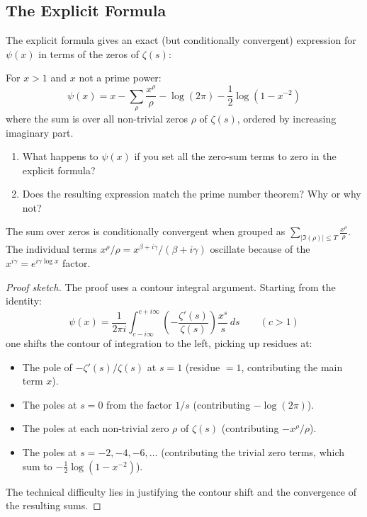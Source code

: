 \subsection{The Explicit Formula}

The explicit formula gives an exact (but conditionally convergent) expression for $\psi(x)$ in terms of the zeros of $\zeta(s)$:

\begin{theorem}
\label{thm:explicit}
For $x > 1$ and $x$ not a prime power:
\[
\psi(x) = x - \sum_{\rho} \frac{x^{\rho}}{\rho} - \log(2\pi) - \frac{1}{2} \log(1 - x^{-2})
\]
where the sum is over all non-trivial zeros $\rho$ of $\zeta(s)$, ordered by increasing imaginary part.
\end{theorem}

\begin{checkyou}
\begin{enumerate}
  \item What happens to $\psi(x)$ if you set all the zero-sum terms to zero in the explicit formula?
  \item Does the resulting expression match the prime number theorem? Why or why not?
\end{enumerate}
\end{checkyou}

\begin{remark}
The sum over zeros is conditionally convergent when grouped as $\sum_{|\Im(\rho)| \le T} \frac{x^{\rho}}{\rho}$. The individual terms $x^{\rho}/\rho = x^{\beta + i\gamma} / (\beta + i\gamma)$ oscillate because of the $x^{i\gamma} = e^{i\gamma \log x}$ factor.
\end{remark}

\begin{proof}[Proof sketch]
The proof uses a contour integral argument. Starting from the identity:
\[
\psi(x) = \frac{1}{2\pi i} \int_{c - i\infty}^{c + i\infty} \left(-\frac{\zeta'(s)}{\zeta(s)}\right) \frac{x^s}{s} \, ds \qquad (c > 1)
\]
one shifts the contour of integration to the left, picking up residues at:
\begin{itemize}
  \item The pole of $-\zeta'(s)/\zeta(s)$ at $s = 1$ (residue $= 1$, contributing the main term $x$).
  \item The poles at $s = 0$ from the factor $1/s$ (contributing $-\log(2\pi)$).
  \item The poles at each non-trivial zero $\rho$ of $\zeta(s)$ (contributing $-x^{\rho}/\rho$).
  \item The poles at $s = -2, -4, -6, \ldots$ (contributing the trivial zero terms, which sum to $-\frac{1}{2}\log(1-x^{-2})$).
\end{itemize}
The technical difficulty lies in justifying the contour shift and the convergence of the resulting sums.
\end{proof}

